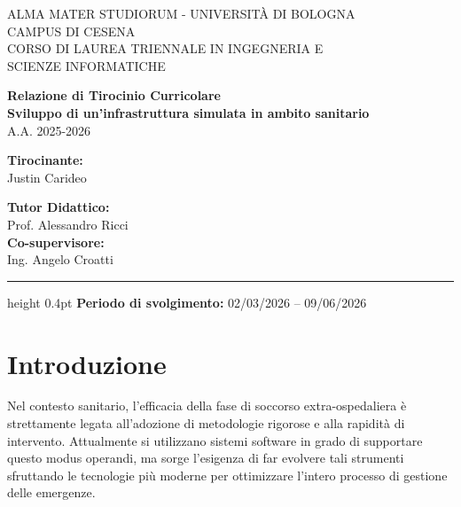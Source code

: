 \documentclass[12pt,a4paper,oneside]{article}
\begin{document}
\begin{titlepage}
    \begin{center}
        \large
        ALMA MATER STUDIORUM - UNIVERSITÀ DI BOLOGNA \\
        \vspace{0.5cm}
        CAMPUS DI CESENA\\
        \vspace{0.5cm}
        CORSO DI LAUREA TRIENNALE IN INGEGNERIA E \\
        SCIENZE INFORMATICHE
        \vspace{3.5cm}
        
        \Large
        \textbf{Relazione di Tirocinio Curricolare} \\
        \vspace{1cm}
        \huge
        \textbf{Sviluppo di un'infrastruttura simulata in ambito sanitario} \\

        \vspace{1cm}
        \large
        A.A. 2025-2026

        \vspace{3.5cm}
        
        \noindent
        \begin{minipage}[t]{0.45\textwidth}
            \large
            \textbf{Tirocinante:}\\
            Justin Carideo
        \end{minipage}
        \hfill
        \begin{minipage}[t]{0.5\textwidth}
            \large
            \raggedleft
            \textbf{Tutor Didattico:}\\
            Prof. Alessandro Ricci\\
            \vspace{0.4cm}
            \textbf{Co-supervisore:}\\
            Ing. Angelo Croatti
        \end{minipage}
        
        \vfill
        \hrule height 0.4pt
        \vspace{0.2cm}
        \large
        \textbf{Periodo di svolgimento:} 02/03/2026 -- 09/06/2026
    \end{center}
\end{titlepage}

\tableofcontents
\newpage

\section{Introduzione}
Nel contesto sanitario, l'efficacia della fase di soccorso extra-ospedaliera è
strettamente legata all'adozione di metodologie rigorose e alla rapidità di
intervento. Attualmente si utilizzano sistemi software in grado di supportare
questo modus operandi, ma sorge l'esigenza di far evolvere tali strumenti
sfruttando le tecnologie più moderne per ottimizzare l'intero processo di
gestione delle emergenze.
\end{document}

